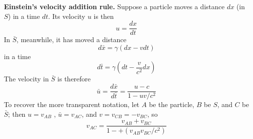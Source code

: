 \documentclass[../main.tex]{subfiles}
\begin{document}
\textbf{Einstein's velocity addition rule.} Suppose a particle moves a distance $dx$ (in $S$) in a time $dt$. Its velocity $u$ is then
\begin{equation*}
    u=\frac{dx}{dt}
\end{equation*}
In $\bar{S}$, meanwhile, it has moved a distance
\begin{equation*}
    d\bar{x}=\gamma(dx-vdt)
\end{equation*}
in a time 
\begin{equation*}
    d\bar{t}=\gamma (dt-\frac{v}{c^2}dx)
\end{equation*}
The velocity in $\bar{S}$ is therefore
\begin{equation*}
    \bar{u}=\frac{d\bar{x}}{d\bar{t}}=\frac{u-c}{1-uv/c^2}
\end{equation*}
To recover the more transparent notation, let $A$ be the particle, $B$ be $S$, and $C$ be $\bar{S}$; then $u = v_{AB}$ , $\bar{u} = v_{AC}$, and $v = v_{C B} = -v_{BC}$, so 
\begin{equation*}
    v_{AC}=\frac{v_{AB}+v_{BC}}{1-+(v_{AB}v_{BC}/c^2)}
\end{equation*}
\end{document}
